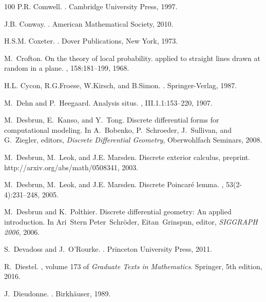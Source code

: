\documentclass[12pt]{amsart}
\begin{document}
\begin{thebibliography}{100}
P.R. Comwell.
.
\newblock Cambridge University Press, 1997.

J.B. Conway.
.
\newblock American Mathematical Society, 2010.

H.S.M. Coxeter.
.
\newblock Dover Publications, New York, 1973.

M.~Crofton.
\newblock On the theory of local probability. applied to straight lines drawn
  at random in a plane.
,
  158:181--199, 1968.

H.L. Cycon, R.G.Froese, W.Kirsch, and B.Simon.
.
\newblock Springer-Verlag, 1987.

M.~Dehn and P.~Heegaard.
\newblock Analysis situs.
, III.1.1:153--220, 1907.

M.~Desbrun, E.~Kanso, and Y.~Tong.
\newblock Discrete differential forms for computational modeling.
\newblock In A.~Bobenko, P.~Schroeder, J.~Sullivan, and G.~Ziegler, editors,
  {\em Discrete Differential Geometry}, Oberwohlfach Seminars, 2008.

M.~Desbrun, M.~Leok, and J.E. Marsden.
\newblock Discrete exterior calculus, preprint.
\newblock http://arxiv.org/abs/math/0508341, 2003.

M.~Desbrun, M.~Leok, and J.E. Marsden.
\newblock Discrete {P}oincar\'e lemma.
, 53(2-4):231--248, 2005.

M.~Desbrun and K.~Polthier.
\newblock Discrete differential geometry: An applied introduction.
\newblock In Ari~Stern Peter~Schr\"oder, Eitan~Grinspun, editor, {\em SIGGRAPH
  2006}, 2006.

S.~Devadoss and J.~O'Rourke.
.
\newblock Princeton University Press, 2011.

R.~Diestel.
, volume 173 of {\em Graduate Texts in
  Mathematics}.
\newblock Springer, 5th edition, 2016.

J.~Dieudonne.
.
\newblock Birkh\"auser, 1989.


\end{thebibliography}
\end{document}
